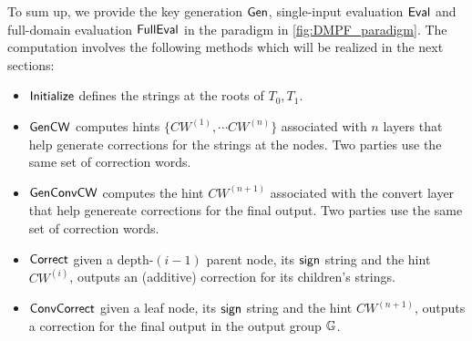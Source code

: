 To sum up, we provide the key generation ${\sf Gen}$, single-input evaluation ${\sf Eval}$ and full-domain evaluation ${\sf FullEval}$ in the paradigm in \cref{fig:DMPF_paradigm}. The computation involves the following methods which will be realized in the next sections: 
\begin{itemize}
  \item $\sf Initialize$ defines the strings at the roots of $T_0,T_1$.
  \item $\sf GenCW$ computes hints $\{CW^{(1)},\cdots CW^{(n)}\}$ associated with $n$ layers that help generate corrections for the strings at the nodes. Two parties use the same set of correction words. 
  \item $\sf GenConvCW$ computes the hint $CW^{(n+1)}$ associated with the convert layer that help genereate corrections for the final output. Two parties use the same set of correction words. 
  \item $\sf Correct$ given a depth-$(i-1)$ parent node, its ${\sf sign}$ string and the hint $CW^{(i)}$, outputs an (additive) correction for its children's strings. 
  \item $\sf ConvCorrect$ given a leaf node, its ${\sf sign}$ string and the hint $CW^{(n+1)}$, outputs a correction for the final output in the output group $\mathbb{G}$. 
\end{itemize}







